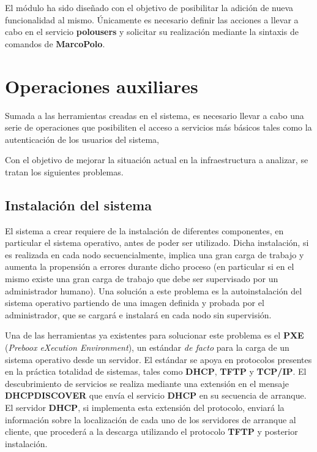 El módulo ha sido diseñado con el objetivo de posibilitar la adición de nueva funcionalidad al mismo. Únicamente es necesario definir las acciones a llevar a cabo en el servicio \textbf{polousers} y solicitar su realización mediante la sintaxis de comandos de \textbf{MarcoPolo}.


\section{Operaciones auxiliares}

Sumada a las herramientas creadas en el sistema, es necesario llevar a cabo una serie de operaciones que posibiliten el acceso a servicios más básicos tales como la autenticación de los usuarios del sistema, %

Con el objetivo de mejorar la situación actual en la infraestructura a analizar, se tratan los siguientes problemas.

\subsection{Instalación del sistema}

El sistema a crear requiere de la instalación de diferentes componentes, en particular el sistema operativo, antes de poder ser utilizado. Dicha instalación, si es realizada en cada nodo secuencialmente, implica una gran carga de trabajo y aumenta la propensión a errores durante dicho proceso (en particular si en el mismo existe una gran carga de trabajo que debe ser supervisado por un administrador humano). Una solución a este problema es la autoinstalación del sistema operativo partiendo de una imagen definida y probada por el administrador, que se cargará e instalará en cada nodo sin supervisión.

Una de las herramientas ya existentes para solucionar este problema es el \textbf{PXE} (\textit{Preboox eXecution Environment})\cite{pxeintel}, un estándar \textit{de facto}\cite{avramov:architecture} para la carga de un sistema operativo desde un servidor. El estándar se apoya en protocolos presentes en la práctica totalidad de sistemas, tales como \textbf{DHCP}, \textbf{TFTP} y \textbf{TCP/IP}. El descubrimiento de servicios se realiza mediante una extensión en el mensaje \textbf{DHCPDISCOVER} que envía el servicio \textbf{DHCP} en su secuencia de arranque\cite{rfc4578}. El servidor \textbf{DHCP}, si implementa esta extensión del protocolo, enviará la información sobre la localización de cada uno de los servidores de arranque al cliente, que procederá a la descarga utilizando el protocolo \textbf{TFTP} y posterior instalación\cite{pxeoverview}.

